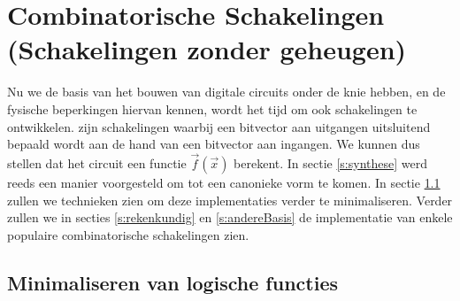 \chapter{Combinatorische Schakelingen (Schakelingen zonder geheugen)}
\label{ch:combinatoric}
\begin{chapterintro}
Nu we de basis van het bouwen van digitale circuits onder de knie hebben, en de fysische beperkingen hiervan kennen, wordt het tijd om ook schakelingen te ontwikkelen.  zijn schakelingen waarbij een bitvector aan uitgangen uitsluitend bepaald wordt aan de hand van een bitvector aan ingangen. We kunnen dus stellen dat het circuit een functie $\vec{f}(\vec{x})$ berekent. In sectie \ref{s:synthese} werd reeds een manier voorgesteld om tot een canonieke vorm te komen. In sectie \ref{s:minimalisatie} zullen we technieken zien om deze implementaties verder te minimaliseren. Verder zullen we in secties \ref{s:rekenkundig} en \ref{s:andereBasis} de implementatie van enkele populaire combinatorische schakelingen zien.%
\end{chapterintro}
\minitoc[n]
\section{Minimaliseren van logische functies}
\label{s:minimalisatie}

